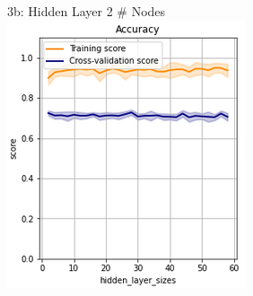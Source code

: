 \documentclass{article}
\begin{document}
\begin{figure}
\begin{subfigure}{.3\textwidth}
	\end{subfigure}
	\begin{subfigure}{.3\textwidth}
		\centering
		3b: Hidden Layer 2 \# Nodes
		\includegraphics[width=\linewidth]{poland_nn_hidden_layer_2_size_2_60_accuracy.png}
		

\end{subfigure}
\end{figure}
\end{document}
